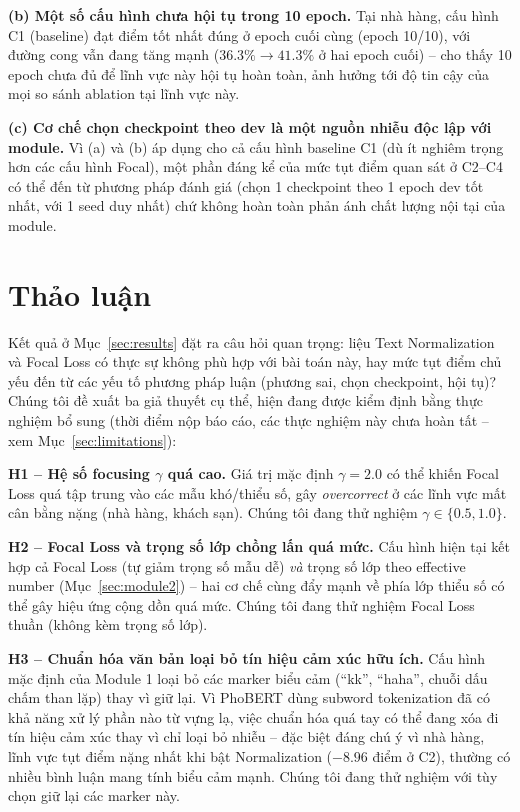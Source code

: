 \documentclass[11pt]{article}
\begin{document}
\textbf{(b) Một số cấu hình chưa hội tụ trong 10 epoch.} Tại nhà hàng, cấu hình C1 (baseline) đạt điểm tốt nhất đúng ở epoch cuối cùng (epoch 10/10), với đường cong vẫn đang tăng mạnh ($36.3\% \rightarrow 41.3\%$ ở hai epoch cuối) -- cho thấy 10 epoch chưa đủ để lĩnh vực này hội tụ hoàn toàn, ảnh hưởng tới độ tin cậy của mọi so sánh ablation tại lĩnh vực này.

\textbf{(c) Cơ chế chọn checkpoint theo dev là một nguồn nhiễu độc lập với module.} Vì (a) và (b) áp dụng cho cả cấu hình baseline C1 (dù ít nghiêm trọng hơn các cấu hình Focal), một phần đáng kể của mức tụt điểm quan sát ở C2--C4 có thể đến từ phương pháp đánh giá (chọn 1 checkpoint theo 1 epoch dev tốt nhất, với 1 seed duy nhất) chứ không hoàn toàn phản ánh chất lượng nội tại của module.


\section{Thảo luận}
\label{sec:discussion}

Kết quả ở Mục~\ref{sec:results} đặt ra câu hỏi quan trọng: liệu Text Normalization và Focal Loss có thực sự không phù hợp với bài toán này, hay mức tụt điểm chủ yếu đến từ các yếu tố phương pháp luận (phương sai, chọn checkpoint, hội tụ)? Chúng tôi đề xuất ba giả thuyết cụ thể, hiện đang được kiểm định bằng thực nghiệm bổ sung (thời điểm nộp báo cáo, các thực nghiệm này chưa hoàn tất -- xem Mục~\ref{sec:limitations}):

\textbf{H1 -- Hệ số focusing $\gamma$ quá cao.} Giá trị mặc định $\gamma=2.0$ có thể khiến Focal Loss quá tập trung vào các mẫu khó/thiểu số, gây \textit{overcorrect} ở các lĩnh vực mất cân bằng nặng (nhà hàng, khách sạn). Chúng tôi đang thử nghiệm $\gamma \in \{0.5, 1.0\}$.

\textbf{H2 -- Focal Loss và trọng số lớp chồng lấn quá mức.} Cấu hình hiện tại kết hợp cả Focal Loss (tự giảm trọng số mẫu dễ) \emph{và} trọng số lớp theo effective number (Mục~\ref{sec:module2}) -- hai cơ chế cùng đẩy mạnh về phía lớp thiểu số có thể gây hiệu ứng cộng dồn quá mức. Chúng tôi đang thử nghiệm Focal Loss thuần (không kèm trọng số lớp).

\textbf{H3 -- Chuẩn hóa văn bản loại bỏ tín hiệu cảm xúc hữu ích.} Cấu hình mặc định của Module 1 loại bỏ các marker biểu cảm (``kk'', ``haha'', chuỗi dấu chấm than lặp) thay vì giữ lại. Vì PhoBERT dùng subword tokenization đã có khả năng xử lý phần nào từ vựng lạ, việc chuẩn hóa quá tay có thể đang xóa đi tín hiệu cảm xúc thay vì chỉ loại bỏ nhiễu -- đặc biệt đáng chú ý vì nhà hàng, lĩnh vực tụt điểm nặng nhất khi bật Normalization ($-8.96$ điểm ở C2), thường có nhiều bình luận mang tính biểu cảm mạnh. Chúng tôi đang thử nghiệm với tùy chọn giữ lại các marker này.
\end{document}
